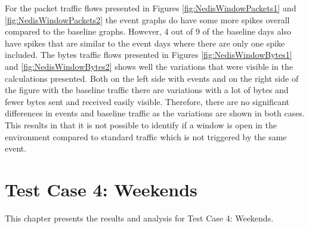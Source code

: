 For the packet traffic flows presented in Figures \ref{fig:NedisWindowPackets1} and \ref{fig:NedisWindowPackets2} the event graphs do have some more spikes overall compared to the baseline graphs. However, 4 out of 9 of the baseline days also have spikes that are similar to the event days where there are only one spike included. The bytes traffic flows presented in Figures \ref{fig:NedisWindowBytes1} and \ref{fig:NedisWindowBytes2} shows well the variations that were visible in the calculations presented. Both on the left side with events and on the right side of the figure with the baseline traffic there are variations with a lot of bytes and fewer bytes sent and received easily visible. Therefore, there are no significant differences in events and baseline traffic as the variations are shown in both cases. This results in that it is not possible to identify if a window is open in the environment compared to standard traffic which is not triggered by the same event. 


\newpage
\section{Test Case 4: Weekends}
This chapter presents the results and analysis for Test Case 4: Weekends. 
